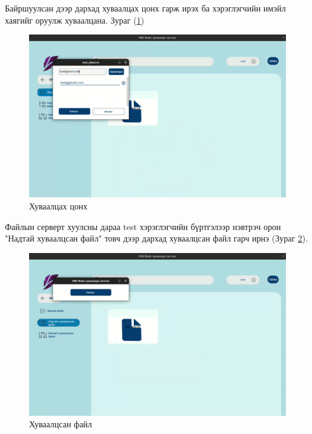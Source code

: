 Байршуулсан дээр дархад хуваалцах цонх гарж ирэх ба хэрэглэгчийн имэйл хаягийг оруулж хуваалцана. Зураг (\ref{fig:share_example})
\begin{figure}[H]
    \centering
    \includegraphics[scale=0.32]{Figures/example/share.png}
    \caption{Хуваалцах цонх}
    \label{fig:share_example}
\end{figure}
Файлын серверт хуулсны дараа test хэрэглэгчийн бүртгэлээр нэвтрэч орон "Надтай хуваалцсан файл" товч дээр дархад хуваалцсан файл гарч ирнэ (Зураг \ref{fig:shared_file}).

\begin{figure}[H]
    \centering
    \includegraphics[scale=0.32]{Figures/example/shared_file.png}
    \caption{Хуваалцсан файл}
    \label{fig:shared_file}
\end{figure}

